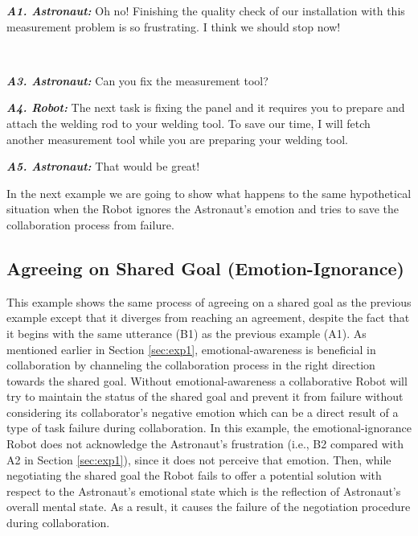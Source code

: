 \begin{description}
  \item \textit{\textbf{A1. Astronaut:}} Oh no! Finishing the quality check of
  our installation with this measurement problem is so frustrating. I think we
  should stop now!\\

  \item {}\\
  
  \item \textit{\textbf{A3. Astronaut:}} Can you fix the measurement tool?\\

  \item \textit{\textbf{A4. Robot:}} The next task is fixing the panel and it
  requires you to prepare and attach the welding rod to your welding tool. To
  save our time, I will fetch another measurement tool while you are preparing
  your welding tool.\\

  \item \textit{\textbf{A5. Astronaut:}} That would be great!
  
\end{description}

In the next example we are going to show what happens to the same hypothetical
situation when the Robot ignores the Astronaut's emotion and tries to save the
collaboration process from failure.

\subsection{Agreeing on Shared Goal (Emotion-Ignorance)}
\label{sec:exp2}

This example shows the same process of agreeing on a shared goal as the previous
example except that it diverges from reaching an agreement, despite the fact
that it begins with the same utterance (B1) as the previous example (A1). As
mentioned earlier in Section \ref{sec:exp1}, emotional-awareness is beneficial
in collaboration by channeling the collaboration process in the right direction
towards the shared goal. Without emotional-awareness a collaborative Robot will
try to maintain the status of the shared goal and prevent it from failure
without considering its collaborator's negative emotion which can be a direct
result of a type of task failure during collaboration. In this example, the
emotional-ignorance Robot does not acknowledge the Astronaut's frustration (i.e.,
B2 compared with A2 in Section \ref{sec:exp1}), since it does not perceive that
emotion. Then, while negotiating the shared goal the Robot fails to offer a
potential solution with respect to the Astronaut's emotional state which is the
reflection of Astronaut's overall mental state. As a result, it causes the
failure of the negotiation procedure during collaboration.

